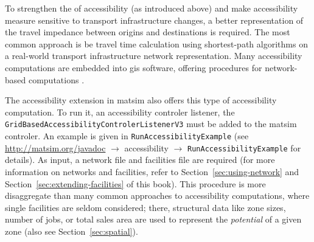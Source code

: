 
To strengthen the  of accessibility (as introduced above) and 
make accessibility measure sensitive to transport infrastructure changes, a better representation of the travel 
impedance between origins and destinations is required. The most common approach is be travel time calculation
using shortest-path algorithms on a real-world transport infrastructure network representation.
Many accessibility computations are embedded into \gls{gis} software, offering procedures for network-based 
computations 
\citep{BBSRErreichbarkeitsmodell, CurtisEtAl2013AccessibilityPolicyInnovation, BuettnerEtAl2010Erreichbarkeitsatlas}.

%

The accessibility extension in \gls{matsim} also offers this type of accessibility computation. To run it, an 
accessibility controler listener, \eg the \lstinline{GridBasedAccessibilityControlerListenerV3} must be added to 
the \gls{matsim} controler. An example is given in \lstinline{RunAccessibilityExample} (see
\url{http://matsim.org/javadoc} $\to$ accessibility $\to$ \lstinline{RunAccessibilityExample} for details). As input, a 
network file and facilities file are required (for more information on networks and facilities, refer to 
Section~\ref{sec:using-network} and Section~\ref{sec:extending-facilities} of this book).
This procedure is more disaggregate than many common approaches to accessibility computations, where single 
facilities are seldom considered; there, structural data like zone sizes, number of jobs, or total sales area are used to 
represent the \emph{potential} of a given zone 
\citep{BuettnerEtAl2010Erreichbarkeitsatlas, GulhanEtAl2014PotentialAccessibilityMeasureDenizli} (also see
Section~\ref{sec:spatial}).


